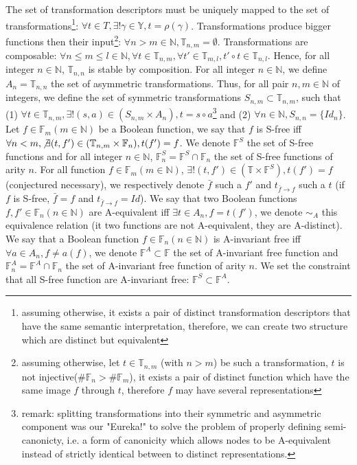 \documentclass[a4paper,10pt]{article}
\newcommand{\N}{\mathbb{N}}%
\newcommand{\F}{\mathbb{F}}
\newcommand{\Y}{\mathbb{Y}}
\newcommand{\T}{\mathbb{T}}
\begin{document}
The set of transformation descriptors must be uniquely mapped to the set of transformations\footnote{assuming otherwise, it exists a pair of distinct transformation descriptors that have the same semantic interpretation, therefore, we can create two structure which are distinct but equivalent}: $\forall t\in T, \exists!\gamma\in\Y, t=\rho(\gamma)$.
Transformations produce bigger functions then their input\footnote{assuming otherwise, let $t\in\T_{n, m}$ (with $n>m$) be such a transformation, $t$ is not injective($\#\F_n > \#\F_m$), it exists a pair of distinct function which have the same image $f$ through $t$, therefore $f$ may have several representations}: $\forall n > m \in\N, \T_{n, m}=\emptyset$.
Transformations are composable: $\forall n \leq m \leq l\in\N, \forall t\in\T_{n, m}, \forall t'\in\T_{m, l}, t' \circ t \in\T_{n, l}$.
Hence, for all integer $n\in\N$, $\T_{n, n}$ is stable by composition.
For all integer $n\in\N$, we define $A_n = \T_{n, n}$ the set of asymmetric transformations.
Thus, for all pair $n, m\in\N$ of integers, we define the set of symmetric transformations $S_{n, m} \subset \T_{n, m}$, such that (1) $\forall t\in\T_{n, m}, \exists!(s, a)\in(S_{n, m}\times A_n), t = s \circ a$\footnote{remark: splitting transformations into their symmetric and asymmetric component was our "Eureka!" to solve the problem of properly defining semi-canonicty, i.e. a form of canonicity which allows nodes to be A-equivalent instead of strictly identical between to distinct representations.} and (2) $\forall n\in\N, S_{n, n} = \{Id_n\}$.
Let $f\in\F_m (m\in\N)$ be a Boolean function, we say that $f$ is S-free iff $\forall n < m, \not\exists (t, f')\in(\T_{n, m}\times\F_n), t(f') = f$. We denote $\F^S$ the set of S-free functions and for all integer $n\in\N$, $\F^S_n  = \F^S\cap\F_n$ the set of S-free functions of arity $n$.
For all function $f\in\F_m (m\in\N)$, $\exists!(t, f')\in(\T\times\F^S), t(f') = f$ (conjectured necessary), we respectively denote $\bar{f}$ such a $f'$ and $t_{\bar{f}\rightarrow f}$ such a $t$ (if $f$ is S-free, $\bar{f}=f$ and $t_{\bar{f}\rightarrow f} = Id$).
We say that two Boolean functions $f, f'\in\F_n (n\in\N)$ are A-equivalent iff $\exists t\in A_n, f=t(f')$, we denote $\sim_A$ this equivalence relation (it two functions are not A-equivalent, they are A-distinct).
We say that a Boolean function $f\in\F_n (n\in\N)$ is A-invariant free iff $\forall a\in A_n, f\neq a(f)$, we denote $\F^A\subset\F$ the set of A-invariant free function and $\F^A_n = \F^A\cap\F_n$ the set of A-invariant free function of arity $n$.
We set the constraint that all S-free function are A-invariant free: $\F^S\subset\F^A$.
\end{document}
